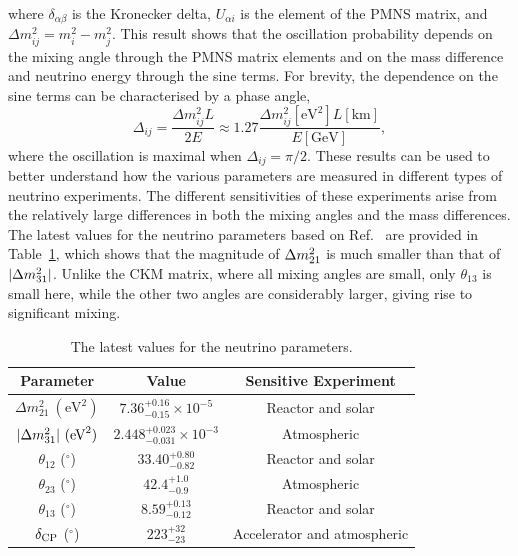 where $\delta_{\alpha\beta}$ is the Kronecker delta, $U_{\alpha i}$ is the element of the PMNS matrix, and $\Delta m^2_{ij} = m_i^2 - m_j^2$.
This result shows that the oscillation probability depends on the mixing angle through the PMNS matrix elements and on the mass difference and neutrino energy through the sine terms.
For brevity, the dependence on the sine terms can be characterised by a phase angle,
\begin{equation}
  \label{eq:osc-phase}
  \Delta_{ij} = \frac{\Delta m^2_{ij} L}{2E} \approx 1.27 \frac{\Delta m^2_{ij} [\text{eV}^2] L [\text{km}]}{E [\text{GeV}]},
\end{equation}
where the oscillation is maximal when $\Delta_{ij} = \pi / 2$.
These results can be used to better understand how the various parameters are measured in different types of neutrino experiments.
The different sensitivities of these experiments arise from the relatively large differences in both the mixing angles and the mass differences.
The latest values for the neutrino parameters based on Ref.~\cite{Capozzi:2021fjo,ParticleDataGroup:2024cfk} are provided in Table~\ref{tab:neutrino-parameters}, which shows that the magnitude of $\Delta m^2_{21}$ is much smaller than that of $|\Delta m^2_{31}|$.
Unlike the CKM matrix, where all mixing angles are small, only $\theta_{13}$ is small here, while the other two angles are considerably larger, giving rise to significant mixing.

\begin{table}[h]
  \centering
  \begin{tabular}{c|c|c}
    Parameter & Value & Sensitive Experiment\\
    \hline
    \hline
    $\Delta m^2_{21}~(\text{eV}^2)$ & $7.36^{+0.16}_{-0.15} \times 10^{-5}$ & Reactor and solar \\
    $|\Delta m^2_{31}|~(\textrm{eV}^2)$ & $2.448^{+0.023}_{-0.031} \times 10^{-3}$ & Atmospheric \\
    $\theta_{12}$ ($^\circ$) & $33.40^{+0.80}_{-0.82}$ & Reactor and solar \\
    $\theta_{23}$ ($^\circ$)       & $42.4^{+1.0}_{-0.9}$ & Atmospheric\\
    $\theta_{13}$ ($^\circ$)       & $8.59^{+0.13}_{-0.12}$ & Reactor and solar \\
    $\delta_\textrm{CP}$ ($^\circ$) & $223^{+32}_{-23}$   & Accelerator and atmospheric \\
    \hline
  \end{tabular}
  \caption{The latest values for the neutrino parameters.}
  \label{tab:neutrino-parameters}
\end{table}

